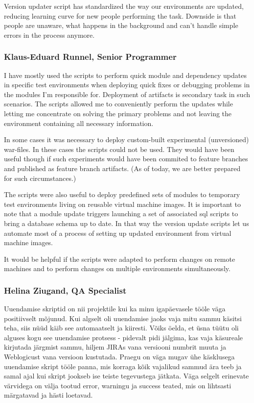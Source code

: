 \documentclass[12pt]{report}
\begin{document}
  Version updater script has standardized the way our environments are updated, reducing learning curve for new people performing the task. Downside is that people are unaware, what happens in the background and can't handle simple errors in the process anymore.
  
  \subsubsection{Klaus-Eduard Runnel, Senior Programmer}
  
  I have mostly used the scripts to perform quick module and dependency updates in specific test environments when deploying quick fixes or debugging problems in the modules I'm responsible for. Deployment of artifacts is secondary task in such scenarios. The scripts allowed me to conveniently perform the updates while letting me concentrate on solving the primary problems and not leaving the environment containing all necessary information.

In some cases it was necessary to deploy custom-built experimental (unversioned) war-files. In these cases the scripts could not be used.
They would have been useful though if such experiments would have been commited to feature branches and published as feature branch artifacts. (As of today, we are better prepared for such circumstances.)

The scripts were also useful to deploy predefined sets of modules to temporary test environments living on reusable virtual machine images. It is important to note that a module update triggers launching a set of associated sql scripts to bring a database schema up to date. In that way the version update scripts let us automate most of a process of setting up updated environment from virtual machine images.

It would be helpful if the scripts were adapted to perform changes on remote machines and to perform changes on multiple environments simultaneously.

  \subsubsection{Helina Ziugand, QA Specialist}
  
  Uuendamise skriptid on nii projektile kui ka minu igapäevasele tööle väga positiivselt mõjunud. 
Kui algselt oli uuendamise jaoks vaja mitu sammu käsitsi teha, siis nüüd käib see automaatselt ja kiiresti. Võiks öelda, et üsna tüütu oli alguses kogu see uuendamise protsess - pidevalt pidi jälgima, kas vaja käsureale kirjutada järgmist sammu, hiljem JIRAs vana versiooni numbrit muuta ja Weblogicust vana versioon kustutada. Praegu on väga mugav ühe käsklusega uuendamise skript tööle panna, mis korraga kõik vajalikud sammud ära teeb ja samal ajal kui skript jookseb ise teiste tegevustega jätkata. Väga selgelt erinevate värvidega on välja tootud error, warningu ja success teated, mis on lihtsasti märgatavad ja hästi loetavad. 
\end{document}
